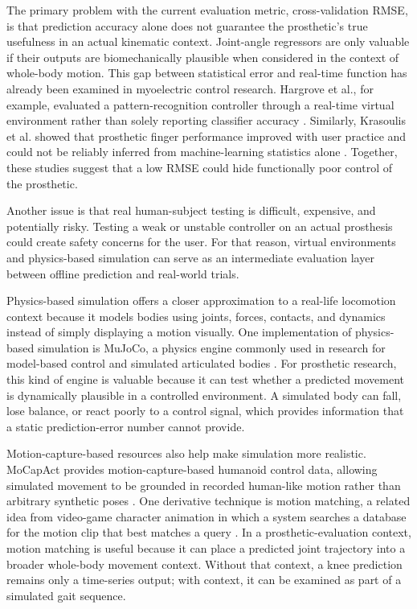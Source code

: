 \documentclass[referee,lineno,pdflatex,sn-vancouver-num]{sn-jnl}
\begin{document}
The primary problem with the current evaluation metric, cross-validation RMSE, is that prediction accuracy alone does not guarantee the prosthetic's true usefulness in an actual kinematic context. Joint-angle regressors are only valuable if their outputs are biomechanically plausible when considered in the context of whole-body motion. This gap between statistical error and real-time function has already been examined in myoelectric control research. Hargrove et al., for example, evaluated a pattern-recognition controller through a real-time virtual environment rather than solely reporting classifier accuracy \cite{hargrove2007}. Similarly, Krasoulis et al. showed that prosthetic finger performance improved with user practice and could not be reliably inferred from machine-learning statistics alone \cite{krasoulis2019}. Together, these studies suggest that a low RMSE could hide functionally poor control of the prosthetic.

Another issue is that real human-subject testing is difficult, expensive, and potentially risky. Testing a weak or unstable controller on an actual prosthesis could create safety concerns for the user. For that reason, virtual environments and physics-based simulation can serve as an intermediate evaluation layer between offline prediction and real-world trials.

Physics-based simulation offers a closer approximation to a real-life locomotion context because it models bodies using joints, forces, contacts, and dynamics instead of simply displaying a motion visually. One implementation of physics-based simulation is MuJoCo, a physics engine commonly used in research for model-based control and simulated articulated bodies \cite{todorov2012}. For prosthetic research, this kind of engine is valuable because it can test whether a predicted movement is dynamically plausible in a controlled environment. A simulated body can fall, lose balance, or react poorly to a control signal, which provides information that a static prediction-error number cannot provide.

Motion-capture-based resources also help make simulation more realistic. MoCapAct provides motion-capture-based humanoid control data, allowing simulated movement to be grounded in recorded human-like motion rather than arbitrary synthetic poses \cite{wagener2022}. One derivative technique is motion matching, a related idea from video-game character animation in which a system searches a database for the motion clip that best matches a query \cite{clavet2016}. In a prosthetic-evaluation context, motion matching is useful because it can place a predicted joint trajectory into a broader whole-body movement context. Without that context, a knee prediction remains only a time-series output; with context, it can be examined as part of a simulated gait sequence.
\end{document}
